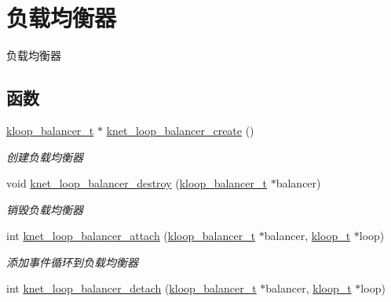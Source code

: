 \hypertarget{a00106}{}\section{负载均衡器}
\label{a00106}


负载均衡器  


\subsection*{函数}
\begin{DoxyCompactItemize}
\item 
\hyperlink{a00051_abd3f964265beb2f8984e76f44fb5ea33_abd3f964265beb2f8984e76f44fb5ea33}{kloop\+\_\+balancer\+\_\+t} $\ast$ \hyperlink{a00106_ga4211b2d32e1a7447e479b9727dce61d4_ga4211b2d32e1a7447e479b9727dce61d4}{knet\+\_\+loop\+\_\+balancer\+\_\+create} ()
\begin{DoxyCompactList}\small\item\em 创建负载均衡器 \end{DoxyCompactList}\item 
void \hyperlink{a00106_ga6fcdd378027b0705cd2e279601985609_ga6fcdd378027b0705cd2e279601985609}{knet\+\_\+loop\+\_\+balancer\+\_\+destroy} (\hyperlink{a00051_abd3f964265beb2f8984e76f44fb5ea33_abd3f964265beb2f8984e76f44fb5ea33}{kloop\+\_\+balancer\+\_\+t} $\ast$balancer)
\begin{DoxyCompactList}\small\item\em 销毁负载均衡器 \end{DoxyCompactList}\item 
int \hyperlink{a00106_ga647f8a2d39c97c8759f8768ebc612b98_ga647f8a2d39c97c8759f8768ebc612b98}{knet\+\_\+loop\+\_\+balancer\+\_\+attach} (\hyperlink{a00051_abd3f964265beb2f8984e76f44fb5ea33_abd3f964265beb2f8984e76f44fb5ea33}{kloop\+\_\+balancer\+\_\+t} $\ast$balancer, \hyperlink{a00051_a97fc76209a58362019f1ded9169e397f_a97fc76209a58362019f1ded9169e397f}{kloop\+\_\+t} $\ast$loop)
\begin{DoxyCompactList}\small\item\em 添加事件循环到负载均衡器 \end{DoxyCompactList}\item 
int \hyperlink{a00106_ga705fd81a537d18cfe1b66df9d15b6c4e_ga705fd81a537d18cfe1b66df9d15b6c4e}{knet\+\_\+loop\+\_\+balancer\+\_\+detach} (\hyperlink{a00051_abd3f964265beb2f8984e76f44fb5ea33_abd3f964265beb2f8984e76f44fb5ea33}{kloop\+\_\+balancer\+\_\+t} $\ast$balancer, \hyperlink{a00051_a97fc76209a58362019f1ded9169e397f_a97fc76209a58362019f1ded9169e397f}{kloop\+\_\+t} $\ast$loop)

\end{DoxyCompactItemize}
